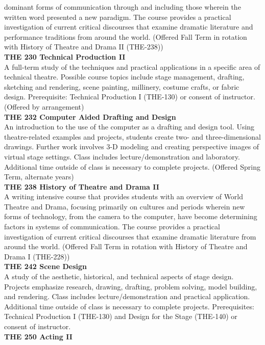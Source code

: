 \documentclass[
  letterpaper,
]{scrbook}
\begin{document}
dominant forms of communication through and including those wherein the
written word presented a new paradigm. The course provides a practical
investigation of current critical discourses that examine dramatic
literature and performance traditions from around the world. (Offered
Fall Term in rotation with History of Theatre and Drama II (THE-238))\\
\textbf{THE 230 Technical Production II}\\
A full-term study of the techniques and practical applications in a
specific area of technical theatre. Possible course topics include stage
management, drafting, sketching and rendering, scene painting,
millinery, costume crafts, or fabric design. Prerequisite: Technical
Production I (THE-130) or consent of instructor. (Offered by
arrangement)\\
\textbf{THE 232 Computer Aided Drafting and Design}\\
An introduction to the use of the computer as a drafting and design
tool. Using theatre-related examples and projects, students create two-
and three-dimensional drawings. Further work involves 3-D modeling and
creating perspective images of virtual stage settings. Class includes
lecture/demonstration and laboratory. Additional time outside of class
is necessary to complete projects. (Offered Spring Term, alternate
years)\\
\textbf{THE 238 History of Theatre and Drama II}\\
A writing intensive course that provides students with an overview of
World Theatre and Drama, focusing primarily on cultures and periods
wherein new forms of technology, from the camera to the computer, have
become determining factors in systems of communication. The course
provides a practical investigation of current critical discourses that
examine dramatic literature from around the world. (Offered Fall Term in
rotation with History of Theatre and Drama I (THE-228))\\
\textbf{THE 242 Scene Design}\\
A study of the aesthetic, historical, and technical aspects of stage
design. Projects emphasize research, drawing, drafting, problem solving,
model building, and rendering. Class includes lecture/demonstration and
practical application. Additional time outside of class is necessary to
complete projects. Prerequisites: Technical Production I (THE-130) and
Design for the Stage (THE-140) or consent of instructor.\\
\textbf{THE 250 Acting II}\\
\end{document}
